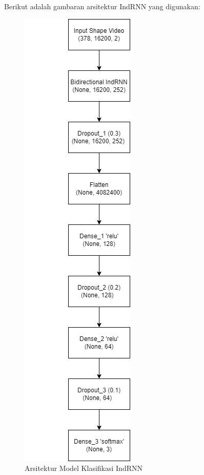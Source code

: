 Berikut adalah gambaran arsitektur IndRNN yang digunakan:

\newpage
\begin{figure} [H] \centering
      \includegraphics[scale=0.7]{gambar/arsitekturmodel.png}
      \caption{Arsitektur Model Klasifikasi IndRNN}
      \label{fig:arsitekturmodel}
\end{figure}

